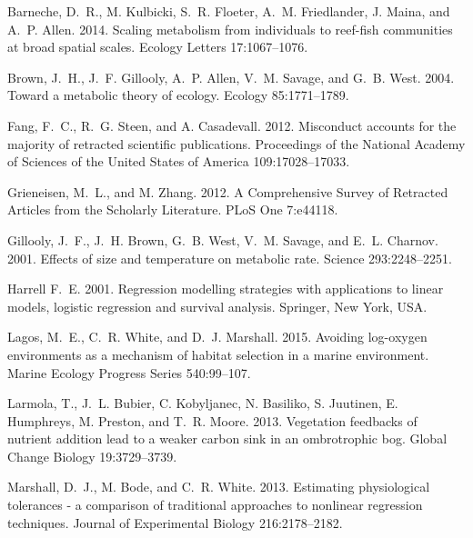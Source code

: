 \documentclass[11pt]{article}
\begin{document}
\begin{thebibliography}{}

Barneche, D.~R., M. Kulbicki, S.~R. Floeter, A.~M. Friedlander, J. Maina, and A.~P. Allen. 2014.
\newblock Scaling metabolism from individuals to reef-fish communities at broad spatial scales.
\newblock Ecology Letters 17:1067--1076.

Brown, J.~H., J.~F. Gillooly, A.~P. Allen, V.~M. Savage, and G.~B. West. 2004.
\newblock Toward a metabolic theory of ecology.
\newblock Ecology 85:1771--1789.

Fang, F.~C., R.~G. Steen, and A. Casadevall. 2012.
\newblock Misconduct accounts for the majority of retracted scientific publications.
\newblock Proceedings of the National Academy of Sciences of the United States of America 109:17028--17033.

Grieneisen, M.~L., and M. Zhang. 2012.
\newblock A Comprehensive Survey of Retracted Articles from the Scholarly Literature.
\newblock PLoS One 7:e44118.

Gillooly, J.~F., J.~H. Brown, G.~B. West, V.~M. Savage, and E.~L. Charnov. 2001.
\newblock Effects of size and temperature on metabolic rate.
\newblock Science 293:2248--2251.

Harrell F.~E. 2001.
\newblock Regression modelling strategies with applications to linear models, logistic regression and survival analysis.
\newblock Springer, New York, USA.

Lagos, M.~E., C.~R. White, and D.~J. Marshall. 2015.
\newblock Avoiding log-oxygen environments as a mechanism of habitat selection in a marine environment.
\newblock Marine Ecology Progress Series 540:99--107.

Larmola, T., J.~L. Bubier, C. Kobyljanec, N. Basiliko, S. Juutinen, E. Humphreys, M. Preston, and T.~R. Moore. 2013.
\newblock Vegetation feedbacks of nutrient addition lead to a weaker carbon sink in an ombrotrophic bog.
\newblock Global Change Biology 19:3729--3739.

Marshall, D.~J., M. Bode, and C.~R. White. 2013.
\newblock Estimating physiological tolerances - a comparison of traditional approaches to nonlinear regression techniques.
\newblock Journal of Experimental Biology 216:2178--2182.


\end{thebibliography}
\end{document}
